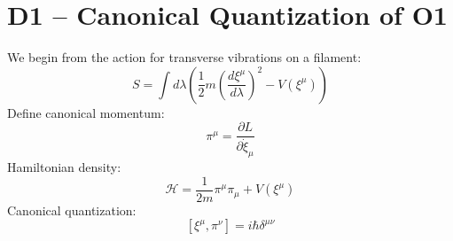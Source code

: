 
\section*{D1 – Canonical Quantization of O1}
We begin from the action for transverse vibrations on a filament:
\[
S = \int d\lambda \left( \frac{1}{2} m \left( \frac{d\xi^\mu}{d\lambda} \right)^2 - V(\xi^\mu) \right)
\]
Define canonical momentum:
\[
\pi^\mu = \frac{\partial L}{\partial \dot{\xi}_\mu}
\]
Hamiltonian density:
\[
\mathcal{H} = \frac{1}{2m} \pi^\mu \pi_\mu + V(\xi^\mu)
\]
Canonical quantization:
\[
[\xi^\mu, \pi^\nu] = i \hbar \delta^{\mu\nu}
\]
